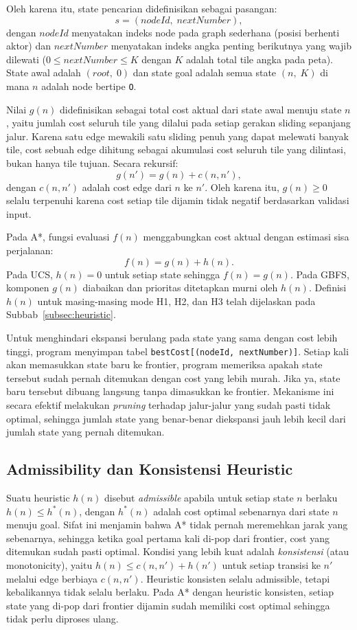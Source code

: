 \documentclass[a4paper,11pt]{article}
\begin{document}
Oleh karena itu, state pencarian didefinisikan sebagai pasangan:
\[
s = (nodeId,\; nextNumber),
\]
dengan $nodeId$ menyatakan indeks node pada graph sederhana (posisi berhenti aktor) dan $nextNumber$ menyatakan indeks angka penting berikutnya yang wajib dilewati ($0 \leq nextNumber \leq K$ dengan $K$ adalah total tile angka pada peta). State awal adalah $(root,\; 0)$ dan state goal adalah semua state $(n,\; K)$ di mana $n$ adalah node bertipe \texttt{O}.

Nilai $g(n)$ didefinisikan sebagai total cost aktual dari state awal menuju state $n$, yaitu jumlah cost seluruh tile yang dilalui pada setiap gerakan sliding sepanjang jalur. Karena satu edge mewakili satu sliding penuh yang dapat melewati banyak tile, cost sebuah edge dihitung sebagai akumulasi cost seluruh tile yang dilintasi, bukan hanya tile tujuan. Secara rekursif:
\[
g(n') = g(n) + c(n, n'),
\]
dengan $c(n, n')$ adalah cost edge dari $n$ ke $n'$. Oleh karena itu, $g(n) \geq 0$ selalu terpenuhi karena cost setiap tile dijamin tidak negatif berdasarkan validasi input.

Pada A*, fungsi evaluasi $f(n)$ menggabungkan cost aktual dengan estimasi sisa perjalanan:
\[
f(n) = g(n) + h(n).
\]
Pada UCS, $h(n) = 0$ untuk setiap state sehingga $f(n) = g(n)$. Pada GBFS, komponen $g(n)$ diabaikan dan prioritas ditetapkan murni oleh $h(n)$. Definisi $h(n)$ untuk masing-masing mode H1, H2, dan H3 telah dijelaskan pada Subbab~\ref{subsec:heuristic}.

Untuk menghindari ekspansi berulang pada state yang sama dengan cost lebih tinggi, program menyimpan tabel \texttt{bestCost[(nodeId, nextNumber)]}. Setiap kali akan memasukkan state baru ke frontier, program memeriksa apakah state tersebut sudah pernah ditemukan dengan cost yang lebih murah. Jika ya, state baru tersebut dibuang langsung tanpa dimasukkan ke frontier. Mekanisme ini secara efektif melakukan \textit{pruning} terhadap jalur-jalur yang sudah pasti tidak optimal, sehingga jumlah state yang benar-benar diekspansi jauh lebih kecil dari jumlah state yang pernah ditemukan.

\subsection{Admissibility dan Konsistensi Heuristic}
\label{subsec:admissibility}

Suatu heuristic $h(n)$ disebut \textit{admissible} apabila untuk setiap state $n$ berlaku $h(n) \leq h^*(n)$, dengan $h^*(n)$ adalah cost optimal sebenarnya dari state $n$ menuju goal. Sifat ini menjamin bahwa A* tidak pernah meremehkan jarak yang sebenarnya, sehingga ketika goal pertama kali di-pop dari frontier, cost yang ditemukan sudah pasti optimal. Kondisi yang lebih kuat adalah \textit{konsistensi} (atau monotonicity), yaitu $h(n) \leq c(n, n') + h(n')$ untuk setiap transisi ke $n'$ melalui edge berbiaya $c(n, n')$. Heuristic konsisten selalu admissible, tetapi kebalikannya tidak selalu berlaku. Pada A* dengan heuristic konsisten, setiap state yang di-pop dari frontier dijamin sudah memiliki cost optimal sehingga tidak perlu diproses ulang.
\end{document}

